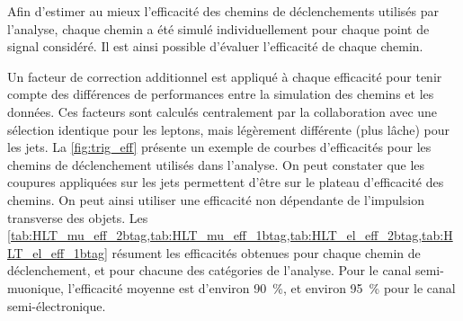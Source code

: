 
Afin d'estimer au mieux l'efficacité des chemins de déclenchements utilisés par l'analyse, chaque chemin a été simulé individuellement pour chaque point de signal considéré. Il est ainsi possible d'évaluer l'efficacité de chaque chemin.

Un facteur de correction additionnel est appliqué à chaque efficacité pour tenir compte des différences de performances entre la simulation des chemins et les données. Ces facteurs sont calculés centralement par la collaboration avec une sélection identique pour les leptons, mais légèrement différente (plus lâche) pour les jets. La \cref{fig:trig_eff} présente un exemple de courbes d'efficacités pour les chemins de déclenchement utilisés dans l'analyse. On peut constater que les coupures appliquées sur les jets permettent d'être sur le plateau d'efficacité des chemins. On peut ainsi utiliser une efficacité non dépendante de l'impulsion transverse des objets. Les \cref{tab:HLT_mu_eff_2btag,tab:HLT_mu_eff_1btag,tab:HLT_el_eff_2btag,tab:HLT_el_eff_1btag} résument les efficacités obtenues pour chaque chemin de déclenchement, et pour chacune des catégories de l'analyse. Pour le canal semi-muonique, l'efficacité moyenne est d'environ \SI{90}{\%}, et environ \SI{95}{\%} pour le canal semi-électronique.



